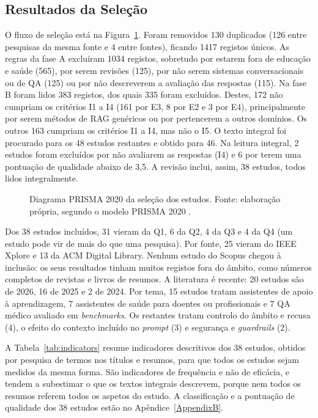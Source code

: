 \subsection{Resultados da Seleção}
\label{sec:chap2_results}

O fluxo de seleção está na Figura~\ref{fig:prisma}. Foram removidos 130 duplicados (126 entre pesquisas da mesma fonte e 4 entre fontes), ficando 1417 registos únicos. As regras da fase A excluíram 1034 registos, sobretudo por estarem fora de educação e saúde (565), por serem revisões (125), por não serem sistemas conversacionais ou de \gls{QA} (125) ou por não descreverem a avaliação das respostas (115). Na fase B foram lidos 383 registos, dos quais 335 foram excluídos. Destes, 172 não cumpriam os critérios I1 a I4 (161 por E3, 8 por E2 e 3 por E4), principalmente por serem métodos de \gls{RAG} genéricos ou por pertencerem a outros domínios. Os outros 163 cumpriam os critérios I1 a I4, mas não o I5. O texto integral foi procurado para os 48 estudos restantes e obtido para 46. Na leitura integral, 2 estudos foram excluídos por não avaliarem as respostas (I4) e 6 por terem uma pontuação de qualidade abaixo de 3,5. A revisão inclui, assim, 38 estudos, todos lidos integralmente.

\begin{figure}[t]
\centering

\caption[Diagrama PRISMA da seleção dos estudos]{Diagrama PRISMA 2020 da seleção dos estudos. Fonte: elaboração própria, segundo o modelo PRISMA 2020 \parencite{page2021prisma}.}
\label{fig:prisma}
\end{figure}

Dos 38 estudos incluídos, 31 vieram da Q1, 6 da Q2, 4 da Q3 e 4 da Q4 (um estudo pode vir de mais do que uma pesquisa). Por fonte, 25 vieram do IEEE Xplore e 13 da ACM Digital Library. Nenhum estudo do Scopus chegou à inclusão: os seus resultados tinham muitos registos fora do âmbito, como números completos de revistas e livros de resumos. A literatura é recente: 20 estudos são de 2026, 16 de 2025 e 2 de 2024. Por tema, 15 estudos tratam assistentes de apoio à aprendizagem, 7 assistentes de saúde para doentes ou profissionais e 7 \gls{QA} médico avaliado em \emph{benchmarks}. Os restantes tratam controlo do âmbito e recusa (4), o efeito do contexto incluído no \emph{prompt} (3) e segurança e \emph{guardrails} (2).

A Tabela~\ref{tab:indicators} resume indicadores descritivos dos 38 estudos, obtidos por pesquisa de termos nos títulos e resumos, para que todos os estudos sejam medidos da mesma forma. São indicadores de frequência e não de eficácia, e tendem a subestimar o que os textos integrais descrevem, porque nem todos os resumos referem todos os aspetos do estudo. A classificação e a pontuação de qualidade dos 38 estudos estão no Apêndice~\ref{AppendixB}.

